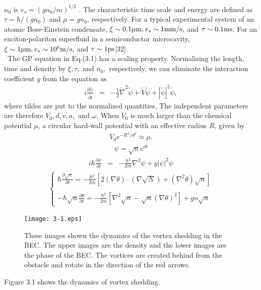 \documentclass[12pt,a4paper]{jbook}
\begin{document}
$n_0$ is $v_s =(g n_0 / m)^{1/2}$ . The characteristic time scale and energy are
defined as $\tau = \hbar/(g n_0)$ and $\mu = g n_0$, respectively.
For a typical experimental system of an atomic Bose-Einstein condensate, $\xi \sim 0.1 {\rm \mu m},
v_s \sim 1 {\rm mm/s},$ and $\tau \sim 0.1 {\rm ms}$. For an exciton-polariton
superfluid in a semiconductor microcavity, $\xi \sim 1 {\rm \mu m}, v_s \sim 10^6 {\rm m/s},$
and $\tau \sim 1 {\rm ps}$[32].
\\
\ The GP equation in Eq.(3.1) has a scaling property. Normalizing the length, time and density
by $\xi,\tau,$ and $n_0,$ respectively, we can eliminate the interaction coefficient $g$
from the equation as
\begin{eqnarray}
i \frac{\partial \tilde{\psi}}{\partial \tilde{t}}
& = & -\frac{1}{2} \tilde{\nabla}^2 \tilde{\psi} + \tilde{V} \tilde{\psi} + |\tilde{\psi}|^2 \tilde{\psi},
\end{eqnarray}
where tildes are put to the normalized quantities, The independent parameters are therefore
$V_0, d, v, a,$ and $\omega$.
When $V_0$ is much larger than the chemical potential $\mu$, a circular hard-wall potential
with an effective radius $R$, given by
\begin{eqnarray}
V_0 e^{-R^2/d^2} \simeq \mu.
\end{eqnarray}
\begin{eqnarray}
\psi = \sqrt{n} e^{i \theta}
\end{eqnarray}
\begin{eqnarray}
i \hbar \frac{\partial \psi}{\partial t} & = & -\frac{\hbar^2}{2m} \nabla^2 \psi + g | \psi |^2 \psi
\end{eqnarray}
\begin{eqnarray}
\left \{
\begin{array}{l}
\displaystyle \hbar \frac{\partial \sqrt{n}}{\partial t} = - \frac{\hbar^2}{2m} \left[ 2 \left(\nabla \theta \right) \cdot \left( \nabla \sqrt{N} \right) + \left( \nabla^2 \theta \right) \sqrt{n} \right]
\\
\\
\displaystyle -\hbar \sqrt{n} \frac{\partial \theta}{\partial t} = - \frac{\hbar^2}{2m} \left[ \nabla^2 \sqrt{n} - \sqrt{n} \left( \nabla \theta \right)^2 \right] + gn \sqrt{n}
\end{array}
\right.
\end{eqnarray}
\begin{figure}[htbp]
\begin{center}
\texttt{[image: 3-1.eps]}
\caption{
These images shown the dynamics of the vortex shedding in the BEC.
The upper images are the density and the lower images are the phase of the BEC.
The vortices are created behind from the obstacle and rotate in the direction of the red arrows.
}
\label{FIG:3-1}
\end{center}
\end{figure}
Figure 3.1 shows the dynamics of vortex shedding.
\end{document}
